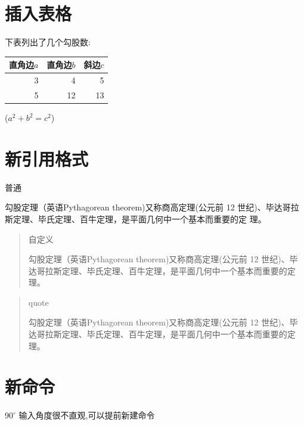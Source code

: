 \documentclass[UTF8]{ctexart}
\newenvironment{myquote}
  {\begin{quote}
  \kaishu
  \zihao{-5}
  }
  {\end{quote}}
\newcommand\degree{^\circ}
\begin{document}
  \section{插入表格}
    下表列出了几个勾股数:
    \begin{table}[H]%
      \begin{tabular}{|rrr|}%
        \hline%
        直角边$a$ & 直角边$b$ & 斜边$c$ \\%
        \hline
        3& 4& 5\\%
        5& 12& 13\\
        \hline
      \end{tabular}%
      \qquad%
      ($a^2 + b^2 = c^2$)
    \end{table}

  \section{新引用格式}
    普通

    勾股定理（英语Pythagorean theorem)又称商高定理(公元前 12 世纪)、毕达哥拉斯定理、毕氏定理、百牛定理，是平面几何中一个基本而重要的定 理。
    \begin{myquote}
      自定义

      勾股定理（英语Pythagorean theorem)又称商高定理(公元前 12 世纪)、毕达哥拉斯定理、毕氏定理、百牛定理，是平面几何中一个基本而重要的定 理。
    \end{myquote}


    \begin{quote}
      quote

      勾股定理（英语Pythagorean theorem)又称商高定理(公元前 12 世纪)、毕达哥拉斯定理、毕氏定理、百牛定理，是平面几何中一个基本而重要的定 理。
    \end{quote}

  \section{新命令}
    $90\degree$
    输入角度很不直观,可以提前新建命令


  \nocite{Shiye}%
\end{document}
